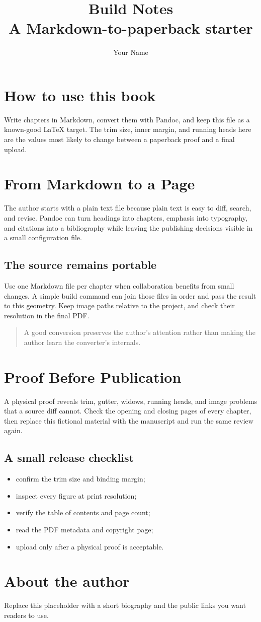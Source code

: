 \documentclass[11pt,oneside]{book}
\title{Build Notes\\[.4em]\large A Markdown-to-paperback starter}
\author{Your Name}
\date{}
\begin{document}
\frontmatter
\maketitle\thispagestyle{empty}
\cleardoublepage
\chapter*{How to use this book}
Write chapters in Markdown, convert them with Pandoc, and keep this file as a known-good LaTeX target. The trim size, inner margin, and running heads here are the values most likely to change between a paperback proof and a final upload.
\tableofcontents
\mainmatter
\chapter{From Markdown to a Page}
The author starts with a plain text file because plain text is easy to diff, search, and revise. Pandoc can turn headings into chapters, emphasis into typography, and citations into a bibliography while leaving the publishing decisions visible in a small configuration file.
\section{The source remains portable}
Use one Markdown file per chapter when collaboration benefits from small changes. A simple build command can join those files in order and pass the result to this geometry. Keep image paths relative to the project, and check their resolution in the final PDF.
\begin{quote}
  \raggedright A good conversion preserves the author's attention rather than making the author learn the converter's internals.
\end{quote}
\chapter{Proof Before Publication}
A physical proof reveals trim, gutter, widows, running heads, and image problems that a source diff cannot. Check the opening and closing pages of every chapter, then replace this fictional material with the manuscript and run the same review again.
\section{A small release checklist}
\begin{itemize}
  \item confirm the trim size and binding margin;
  \item inspect every figure at print resolution;
  \item verify the table of contents and page count;
  \item read the PDF metadata and copyright page;
  \item upload only after a physical proof is acceptable.
\end{itemize}
\backmatter
\chapter*{About the author}
Replace this placeholder with a short biography and the public links you want readers to use.
\end{document}
